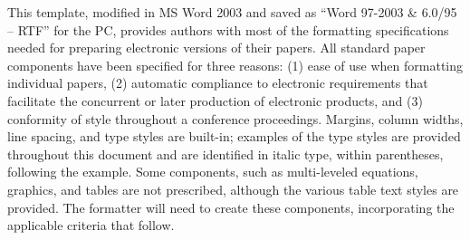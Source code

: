 \documentclass[letterpaper, 12 pt, conference]{ieeeconf}  %
\begin{document}
This template, modified \cite{noauthor_why_2014} in MS Word 2003 and saved as ``Word 97-2003 \& 6.0/95 -- RTF'' for the PC, provides authors with most of the formatting specifications needed for preparing electronic versions of their papers. All standard paper components have been specified for three reasons: (1) ease of use when formatting individual papers, (2) automatic compliance to electronic requirements that facilitate the concurrent or later production of electronic products, and (3) conformity of style throughout a conference proceedings. Margins, column widths, line spacing, and type styles are built-in; examples of the type styles are provided throughout this document and are identified in italic type, within parentheses, following the example. Some components, such as multi-leveled equations, graphics, and tables are not prescribed, although the various table text styles are provided. The formatter will need to create these components, incorporating the applicable criteria that follow.
\end{document}

